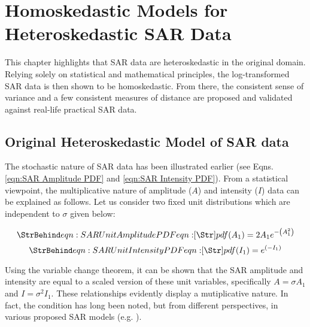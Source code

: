 \chapter{Homoskedastic Models for Heteroskedastic SAR Data} %
\label{chap:sar}

This chapter  highlights that SAR
                data are heteroskedastic in the original domain.
Relying solely on statistical and mathematical principles,             
the log-transformed SAR data is then shown to be homoskedastic.
From there, the consistent sense of variance and a few consistent measures of distance are proposed and validated against real-life
                practical SAR data.

\section{Original Heteroskedastic Model of SAR data}
\label{sec:heteroskedastic_sar}

The stochastic nature of SAR data has been illustrated earlier (see Eqns. \ref{eqn:SAR Amplitude PDF} and \ref{eqn:SAR Intensity PDF}).
From a statistical viewpoint, the multiplicative nature of amplitude ($A$) and intensity ($I$)  data can be explained as follows. 
Let us consider two fixed unit distributions which are independent to $\sigma$ given below:

\begin{equation}
\label{eqn:SAR Unit Amplitude PDF}
\caption{eqn:SAR Unit Amplitude PDF}
pdf(A_1) = 2A_1 e^{ - \left( A_1^2 \right) }
\end{equation}
\begin{equation}
  \label{eqn:SAR Unit Intensity PDF}
  \caption{eqn:SAR Unit Intensity PDF}
pdf(I_1) = e^{ \left( -I_1 \right) }
\end{equation}

Using the variable change theorem,
    it can be shown that
    the SAR amplitude and intensity are equal to %
    a scaled version of these unit variables,
    specifically $A= \sigma A_1 $ and $I= \sigma^2 I_1 $. 
These relationships evidently display a mutiplicative nature. 
In fact, the condition has long been noted,
  but from different perspectives,
  in various proposed SAR models (e.g. \cite{Jakeman_1980_JPhysAMathGen}).

